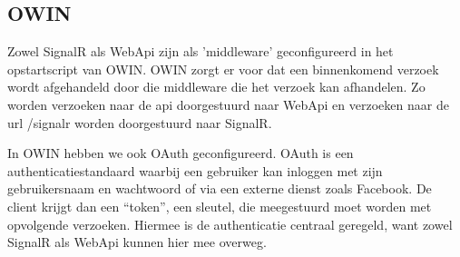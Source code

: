 \subsection{OWIN}
Zowel SignalR als WebApi zijn als 'middleware' geconfigureerd in het opstartscript van OWIN. OWIN zorgt er voor dat een binnenkomend verzoek wordt afgehandeld door die middleware die het verzoek kan afhandelen. Zo worden verzoeken naar de api doorgestuurd naar WebApi en verzoeken naar de url /signalr worden doorgestuurd naar SignalR. 

In OWIN hebben we ook OAuth geconfigureerd. OAuth is een authenticatiestandaard waarbij een gebruiker kan inloggen met zijn gebruikersnaam en wachtwoord of via een externe dienst zoals Facebook. De client krijgt dan een ``token'', een sleutel, die meegestuurd moet worden met opvolgende verzoeken. Hiermee is de authenticatie centraal geregeld, want zowel SignalR als WebApi kunnen hier mee overweg.